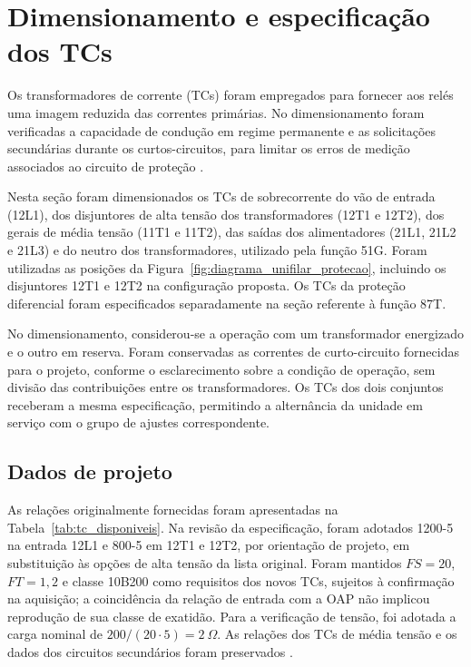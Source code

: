 \newpage
\section{\textbf{Dimensionamento e especificação dos TCs}}


Os transformadores de corrente (TCs) foram empregados para fornecer aos relés uma imagem reduzida das correntes primárias. No dimensionamento foram verificadas a capacidade de condução em regime permanente e as solicitações secundárias durante os curtos-circuitos, para limitar os erros de medição associados ao circuito de proteção \cite{mamede2013}.

Nesta seção foram dimensionados os TCs de sobrecorrente do vão de entrada (12L1), dos disjuntores de alta tensão dos transformadores (12T1 e 12T2), dos gerais de média tensão (11T1 e 11T2), das saídas dos alimentadores (21L1, 21L2 e 21L3) e do neutro dos transformadores, utilizado pela função 51G. Foram utilizadas as posições da Figura~\ref{fig:diagrama_unifilar_protecao}, incluindo os disjuntores 12T1 e 12T2 na configuração proposta. Os TCs da proteção diferencial foram especificados separadamente na seção referente à função 87T.

No dimensionamento, considerou-se a operação com um transformador energizado e o outro em reserva. Foram conservadas as correntes de curto-circuito fornecidas para o projeto, conforme o esclarecimento sobre a condição de operação, sem divisão das contribuições entre os transformadores. Os TCs dos dois conjuntos receberam a mesma especificação, permitindo a alternância da unidade em serviço com o grupo de ajustes correspondente.

\subsection{Dados de projeto}

As relações originalmente fornecidas foram apresentadas na Tabela~\ref{tab:tc_disponiveis}. Na revisão da especificação, foram adotados 1200-5 na entrada 12L1 e 800-5 em 12T1 e 12T2, por orientação de projeto, em substituição às opções de alta tensão da lista original. Foram mantidos $FS=20$, $FT=1{,}2$ e classe 10B200 como requisitos dos novos TCs, sujeitos à confirmação na aquisição; a coincidência da relação de entrada com a OAP não implicou reprodução de sua classe de exatidão. Para a verificação de tensão, foi adotada a carga nominal de $200/(20\cdot5)=2~\Omega$. As relações dos TCs de média tensão e os dados dos circuitos secundários foram preservados \cite{sampaio2026roteiro,cysne2026protecao}.

